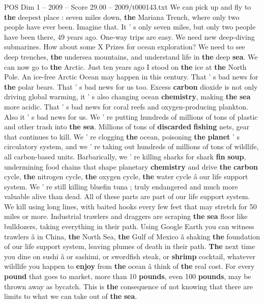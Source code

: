 \begin{textsample}{POS Dim 1 – 2009 – Score 29.00 – 2009/t000143.txt}
We can pick up and fly to \textbf{the} deepest place : seven miles down, \textbf{the} Mariana Trench, where only two people have ever been.
Imagine that.
It ' s only seven miles, but only two people have been there, 49 years ago.
One-way trips are easy.
We need new deep-diving submarines.
How about some X Prizes for ocean exploration?
We need to see deep trenches, \textbf{the} undersea mountains, and understand life in \textbf{the} deep \textbf{sea}.
We can now go to \textbf{the} Arctic.
Just ten years ago I stood on \textbf{the} ice at \textbf{the} North Pole.
An ice-free Arctic Ocean may happen in this century.
That ' s bad news for \textbf{the} polar bears.
That ' s bad news for us too.
Excess \textbf{carbon} dioxide is not only driving global warming, it ' s also changing ocean \textbf{chemistry}, making \textbf{the} \textbf{sea} more acidic.
That ' s bad news for coral reefs and oxygen-producing plankton.
Also it ' s bad news for us.
We ' re putting hundreds of millions of tons of plastic and other trash into \textbf{the} \textbf{sea}.
Millions of tons of \textbf{discarded} \textbf{fishing} nets, gear that continues to kill.
We ' re clogging \textbf{the} ocean, poisoning \textbf{the} \textbf{planet} ' s circulatory system, and we ' re taking out hundreds of millions of tons of wildlife, all carbon-based units.
Barbarically, we ' re killing sharks for shark \textbf{fin} \textbf{soup}, undermining food chains that shape planetary \textbf{chemistry} and drive \textbf{the} \textbf{carbon} cycle, \textbf{the} nitrogen cycle, \textbf{the} oxygen cycle, \textbf{the} water cycle â our life support system.
We ' re still killing bluefin tuna ; truly endangered and much more valuable alive than dead.
All of these parts are part of our life support system.
We kill using long lines, with baited hooks every few feet that may stretch for 50 miles or more.
Industrial trawlers and draggers are scraping \textbf{the} \textbf{sea} floor like bulldozers, taking everything in their path.
Using Google Earth you can witness trawlers â in China, \textbf{the} North Sea, \textbf{the} Gulf of Mexico â shaking \textbf{the} foundation of our life support system, leaving plumes of death in their path. \textbf{The} next time you dine on sushi â or sashimi, or swordfish steak, or \textbf{shrimp} cocktail, whatever wildlife you happen to \textbf{enjoy} from \textbf{the} ocean â think of \textbf{the} real cost.
For every \textbf{pound} that goes to market, more than 10 \textbf{pounds}, even 100 \textbf{pounds}, may be thrown away as bycatch.
This is \textbf{the} consequence of not knowing that there are limits to what we can take out of \textbf{the} \textbf{sea}.

\end{textsample}
